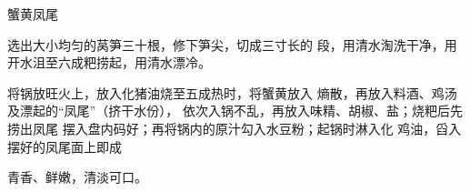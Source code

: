\begin{recipe}{蟹黄凤尾}

\ingredients


\cooking

\step 选出大小均匀的莴笋三十根，修下笋尖，切成三寸长的 段，用清水淘洗干净，用开水沮至六成粑捞起，用清水漂冷。

\step 将锅放旺火上，放入化猪油烧至五成热时，将蟹黄放入 熵散，再放入料酒、鸡汤及漂起的“凤尾”（挤干水份）， 依次入锅不乱，再放入味精、胡椒、盐；烧粑后先捞出凤尾 摆入盘内码好；再将锅内的原汁勾入水豆粉；起锅时淋入化 鸡油，舀入摆好的凤尾面上即成

\notes

青香、鲜嫩，清淡可口。

\end{recipe}

